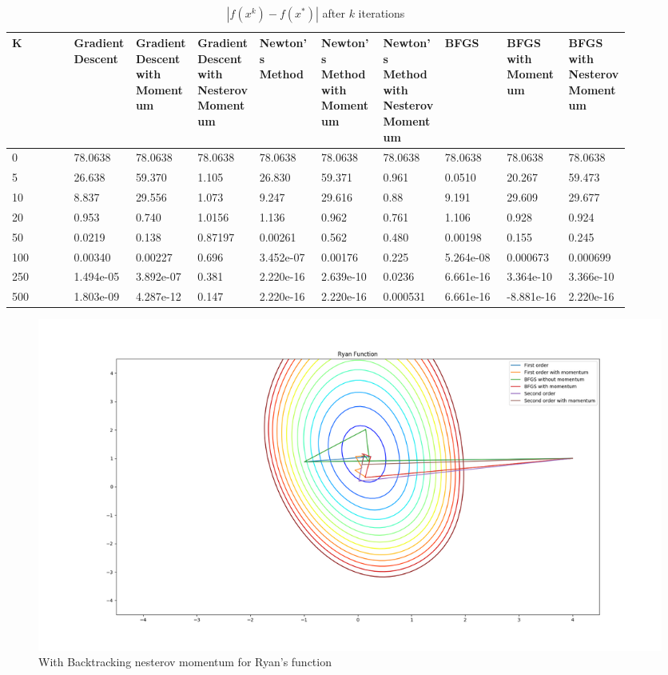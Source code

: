 \documentclass{article}
\begin{document}
\begin{table}[H]
	\centering
	\caption{$ | f(x^k) - f(x^*) | $ after $k$ iterations}
	\label{Ryan function table}
	\begin{tabular}{|l|p{0.1\linewidth}|p{0.1\linewidth}|p{0.1\linewidth}|p{0.1\linewidth}|p{0.1\linewidth}|p{0.1\linewidth}|p{0.1\linewidth}|p{0.1\linewidth}|p{0.1\linewidth}|}
		\hline
		K & Gradient Descent & Gradient Descent with Momentum & Gradient Descent with Nesterov Momentum & Newton's Method & Newton's Method with Momentum & Newton's Method with Nesterov Momentum & BFGS & BFGS with Momentum & BFGS with Nesterov Momentum \\
		\hline
		0 & 78.0638 & 78.0638 & 78.0638 & 78.0638 & 78.0638 & 78.0638 & 78.0638 & 78.0638 & 78.0638 \\
		\hline
		5 & 26.638 & 59.370 & 1.105 & 26.830 & 59.371 & 0.961 & 0.0510 & 20.267 & 59.473 \\
		\hline
		10 & 8.837 & 29.556 & 1.073 & 9.247 & 29.616 & 0.88 & 9.191 & 29.609 & 29.677 \\
		\hline
		20 & 0.953 & 0.740 & 1.0156 & 1.136 & 0.962 & 0.761 & 1.106 & 0.928 & 0.924 \\
		\hline
		50 & 0.0219 & 0.138 & 0.87197 & 0.00261 & 0.562 & 0.480 & 0.00198 & 0.155 & 0.245 \\
		\hline
		100 & 0.00340 & 0.00227 & 0.696 & 3.452e-07 & 0.00176 & 0.225 & 5.264e-08 & 0.000673 & 0.000699 \\
		\hline
		250 & 1.494e-05 & 3.892e-07 & 0.381 & 2.220e-16 & 2.639e-10 & 0.0236 & 6.661e-16 & 3.364e-10 & 3.366e-10 \\
		\hline
		500 & 1.803e-09 & 4.287e-12 & 0.147 & 2.220e-16 & 2.220e-16 & 0.000531 & 6.661e-16 & -8.881e-16 & 2.220e-16 \\
		\hline
	\end{tabular}
\end{table}

\begin{figure}[H]
	\includegraphics[width=\linewidth]{../Images/ryanbacktrack.png}
	\caption{With Backtracking nesterov momentum for Ryan's function}
	\label{fig:With Backtracking nesterov momentum for Ryan's function}
\end{figure}
\end{document}
